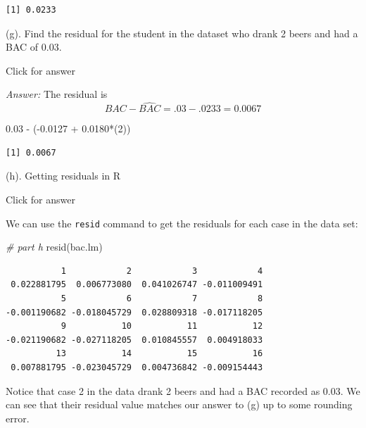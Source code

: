 \documentclass[
]{book}
\newenvironment{Shaded}{\begin{snugshade}}{\end{snugshade}}
\newcommand{\CommentTok}[1]{\textcolor[rgb]{0.56,0.35,0.01}{\textit{#1}}}
\newcommand{\DecValTok}[1]{\textcolor[rgb]{0.00,0.00,0.81}{#1}}
\newcommand{\FloatTok}[1]{\textcolor[rgb]{0.00,0.00,0.81}{#1}}
\newcommand{\FunctionTok}[1]{\textcolor[rgb]{0.00,0.00,0.00}{#1}}
\newcommand{\NormalTok}[1]{#1}
\newcommand{\SpecialCharTok}[1]{\textcolor[rgb]{0.00,0.00,0.00}{#1}}
\begin{document}
\begin{verbatim}
[1] 0.0233
\end{verbatim}

(g). Find the residual for the student in the dataset who drank 2 beers and had a BAC of 0.03.

Click for answer

\emph{Answer:} The residual is
\[
BAC - \widehat{BAC} = .03 - .0233=0.0067
\]

\begin{Shaded}
\begin{Highlighting}[]
\FloatTok{0.03} \SpecialCharTok{{-}}\NormalTok{ (}\SpecialCharTok{{-}}\FloatTok{0.0127} \SpecialCharTok{+} \FloatTok{0.0180}\SpecialCharTok{*}\NormalTok{(}\DecValTok{2}\NormalTok{)) }
\end{Highlighting}
\end{Shaded}

\begin{verbatim}
[1] 0.0067
\end{verbatim}

(h). Getting residuals in R

Click for answer

We can use the \texttt{resid} command to get the residuals for each case in the data set:

\begin{Shaded}
\begin{Highlighting}[]
\CommentTok{\# part h}
\FunctionTok{resid}\NormalTok{(bac.lm)}
\end{Highlighting}
\end{Shaded}

\begin{verbatim}
           1            2            3            4 
 0.022881795  0.006773080  0.041026747 -0.011009491 
           5            6            7            8 
-0.001190682 -0.018045729  0.028809318 -0.017118205 
           9           10           11           12 
-0.021190682 -0.027118205  0.010845557  0.004918033 
          13           14           15           16 
 0.007881795 -0.023045729  0.004736842 -0.009154443 
\end{verbatim}

Notice that case 2 in the data drank 2 beers and had a BAC recorded as 0.03. We can see that their residual value matches our answer to (g) up to some rounding error.

\begin{Shaded}
\end{Shaded}
\end{document}
